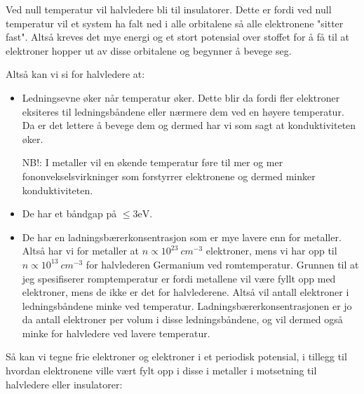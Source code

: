 \documentclass{article}
\begin{document}
Ved null temperatur vil halvledere bli til insulatorer. Dette er fordi ved null temperatur vil et system ha falt ned i alle orbitalene så alle elektronene "sitter fast". Altså kreves det mye energi og et stort potensial over stoffet for å få til at elektroner hopper ut av disse orbitalene og begynner å bevege seg. 

Altså kan vi si for halvledere at:
\begin{itemize}
  \item Ledningsevne øker når temperatur øker. Dette blir da fordi fler elektroner eksiteres til ledningsbåndene eller nærmere dem ved en høyere temperatur. Da er det lettere å bevege dem og dermed har vi som sagt at konduktiviteten øker.
  
  NB!: I metaller vil en økende temperatur føre til mer og mer fononvekselsvirkninger som forstyrrer elektronene og dermed minker konduktiviteten.
  \item De har et båndgap på $\le 3 \text{eV}$.
  \item De har en ladningsbærerkonsentrasjon som er mye lavere enn for metaller. Altså har vi for metaller at $n \propto 10^{23} \ cm^{-3}$ elektroner, mens vi har opp til $n \propto 10^{13} \ cm^{-3}$ for halvlederen Germanium ved romtemperatur. Grunnen til at jeg spesifiserer romptemperatur er fordi metallene vil være fyllt opp med elektroner, mens de ikke er det for halvlederene. Altså vil antall elektroner i ledningsbåndene minke ved temperatur. Ladningsbærerkonsentrasjonen er jo da antall elektroner per volum i disse ledningsbåndene, og vil dermed også minke for halvledere ved lavere temperatur.
\end{itemize}

Så kan vi tegne frie elektroner og elektroner i et periodisk potensial, i tillegg til hvordan elektronene ville vært fylt opp i disse i metaller i motsetning til halvledere eller insulatorer:
\end{document}
